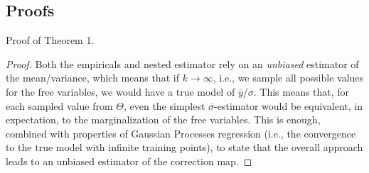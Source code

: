 \documentclass[runningheads,a4paper]{llncs}
\begin{document}
\subsection{Proofs} \label{app:proofs}

Proof of Theorem 1.
\begin{proof}
Both the empiricals and nested estimator rely on an {\em unbiased} estimator of the mean/variance, which means that if $k\to \infty$, i.e., we sample all possible values for the free variables, we would have a true model of  $\overline{y}$/$\sigma$. This means that, for each sampled value from $\Theta$, even the simplest $\overline{\sigma}$-estimator would be  equivalent, in expectation, to the marginalization of the free variables.  This is enough, combined with  properties of Gaussian Processes regression (i.e., the convergence to the true model with infinite training points), to state that the overall approach leads to an unbiased estimator of the correction map. 
\end{proof}
\end{document}
